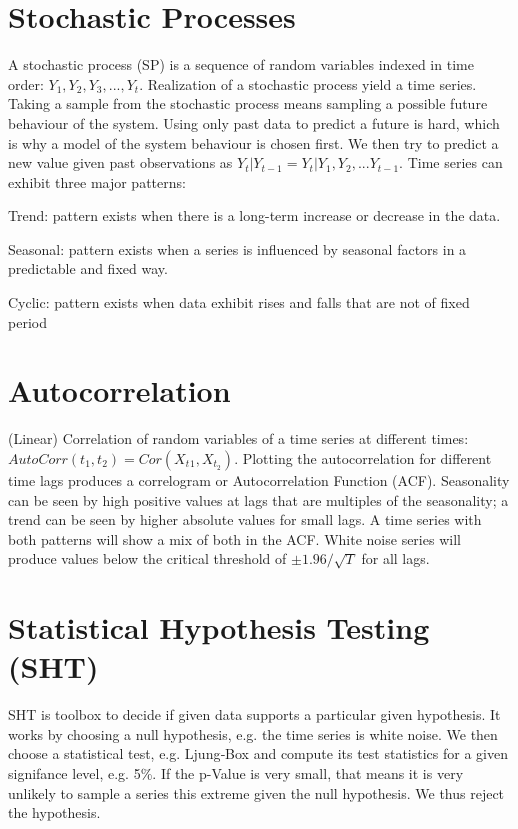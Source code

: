 
\section{Stochastic Processes}
A stochastic process (SP) is a sequence of random variables indexed in time order: $ Y_1, Y_2, Y_3, ..., Y_t $.
Realization of a stochastic process yield a time series.
Taking a sample from the stochastic process means sampling a possible future behaviour of the system.
Using only past data to predict a future is hard, which is why a model of the system behaviour is chosen first.
We then try to predict a new value given past observations as $ Y_t | Y_{t-1} = Y_t | Y_1, Y_2, ... Y_{t-1} $. Time series can exhibit three major patterns:

Trend: pattern exists when there is a long-term increase or decrease in the data.

Seasonal: pattern exists when a series is influenced by seasonal factors in a predictable and fixed way.

Cyclic: pattern exists when data exhibit rises and falls that are not of fixed period

\section{Autocorrelation}
(Linear) Correlation of random variables of a time series at different times: $ AutoCorr(t_1, t_2) = Cor(X_t{_1}, X_{t_2}) $.
Plotting the autocorrelation for different time lags produces a correlogram or Autocorrelation Function (ACF).
Seasonality can be seen by high positive values at lags that are multiples of the seasonality; a trend can be seen by higher absolute values for small lags.
A time series with both patterns will show a mix of both in the ACF. White noise series will produce values below the critical threshold of $ \pm 1.96 / \sqrt{T} $ for all lags.

\section{Statistical Hypothesis Testing (SHT)}
SHT is toolbox to decide if given data supports a particular given hypothesis.
It works by choosing a null hypothesis, e.g. the time series is white noise.
We then choose a statistical test, e.g. Ljung‐Box and compute its test statistics for a given signifance level, e.g. 5\%.
If the p-Value is very small, that means it is very unlikely to sample a series this extreme given the null hypothesis. We thus reject the hypothesis.

